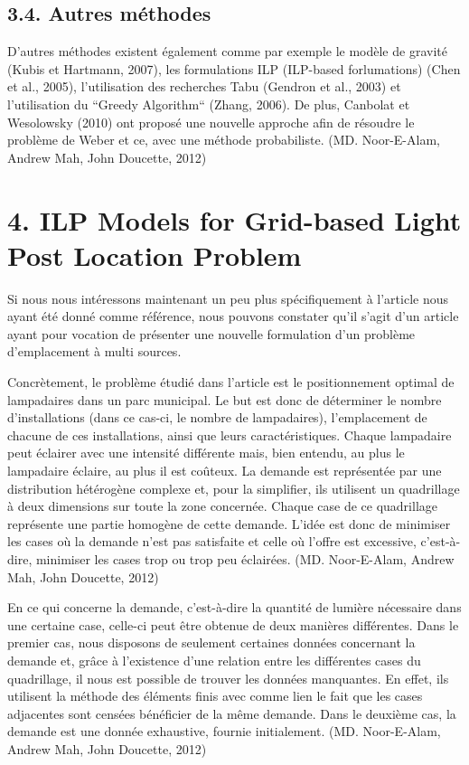 \section*{3.4. Autres méthodes}

\bigskip

D'autres méthodes existent également comme par exemple le modèle de gravité (Kubis et Hartmann, 2007), les formulations ILP (ILP-based forlumations) (Chen et al., 2005), l'utilisation des recherches Tabu (Gendron et al., 2003) et l'utilisation du ``Greedy Algorithm`` (Zhang, 2006). De plus, Canbolat et Wesolowsky (2010) ont proposé une nouvelle approche afin de résoudre le problème de Weber et ce, avec une méthode probabiliste. (MD. Noor-E-Alam, Andrew Mah, John Doucette, 2012)

\chapter*{4. ILP Models for Grid-based Light Post Location Problem}

\bigskip

Si nous nous intéressons maintenant un peu plus spécifiquement à l'article nous ayant été donné comme référence, nous pouvons constater qu'il s'agit d'un article ayant pour vocation de présenter une nouvelle formulation d'un problème d'emplacement à multi sources. 

\bigskip

Concrètement, le problème étudié dans l'article est le positionnement optimal de lampadaires dans un parc municipal. 
Le but est donc de déterminer le nombre d'installations (dans ce cas-ci, le nombre de lampadaires), l'emplacement de chacune de ces installations, ainsi que leurs caractéristiques. Chaque lampadaire peut éclairer avec une intensité différente mais, bien entendu, au plus le lampadaire éclaire, au plus il est coûteux. 
La demande est représentée par une distribution hétérogène complexe et, pour la simplifier, ils utilisent un quadrillage à deux dimensions sur toute la zone concernée. Chaque case de ce quadrillage représente une partie homogène de cette demande. L'idée est donc de minimiser les cases où la demande n'est pas satisfaite et celle où l'offre est excessive, c'est-à-dire, minimiser les cases trop ou trop peu éclairées. (MD. Noor-E-Alam, Andrew Mah, John Doucette, 2012)

\bigskip

En ce qui concerne la demande, c'est-à-dire la quantité de lumière nécessaire dans une certaine case, celle-ci peut être obtenue de deux manières différentes. Dans le premier cas, nous disposons de seulement certaines données concernant la demande et, grâce à l'existence d'une relation entre les différentes cases du quadrillage, il nous est possible de trouver les données manquantes. En effet, ils utilisent la méthode des éléments finis avec comme lien le fait que les cases adjacentes sont censées  bénéficier de la même demande. Dans le deuxième cas, la demande est une donnée exhaustive, fournie initialement. (MD. Noor-E-Alam, Andrew Mah, John Doucette, 2012)

